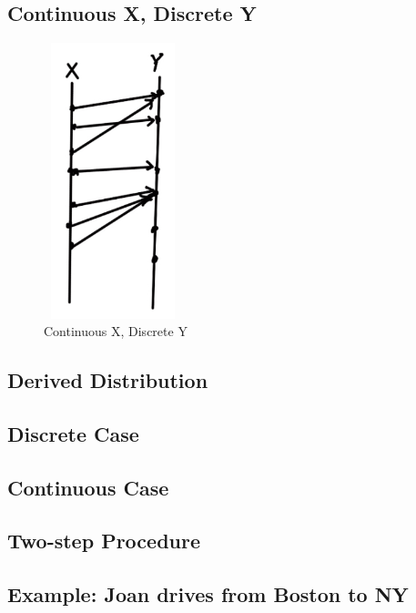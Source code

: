 \subsection{Continuous X, Discrete Y}


\begin{figure}[ht]
\centering
\includegraphics[width=4cm, height=8cm]{images/L10/continuous_discrete.jpeg}
\caption{Continuous X, Discrete Y}
\end{figure}

\subsection{Derived Distribution}


\subsection{Discrete Case}


\subsection{Continuous Case}


\subsection{Two-step Procedure}


\subsection{Example: Joan drives from Boston to NY}

